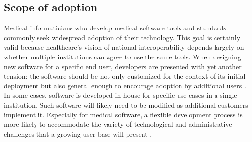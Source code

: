 \documentclass[12pt]{article} %
\begin{document}
\subsection{Scope of adoption}
Medical informaticians who develop medical software tools and standards commonly seek widespread adoption of their technology.
This goal is certainly valid because healthcare's vision of national interoperability depends largely on whether multiple institutions can agree to use the same tools.
When designing new software for a specific end user, developers are presented with yet another tension: the software should be not only customized for the context of its initial deployment but also general enough to encourage adoption by additional users \cite{johannessen2009}.
In some cases, software is developed in-house for specific use cases in a single institution.
Such software will likely need to be modified as additional customers implement it.
Especially for medical software, a flexible development process is more likely to accommodate the variety of technological and administrative challenges that a growing user base will present \cite{johannessen2009, porruvecchio2007}.


\end{document}
